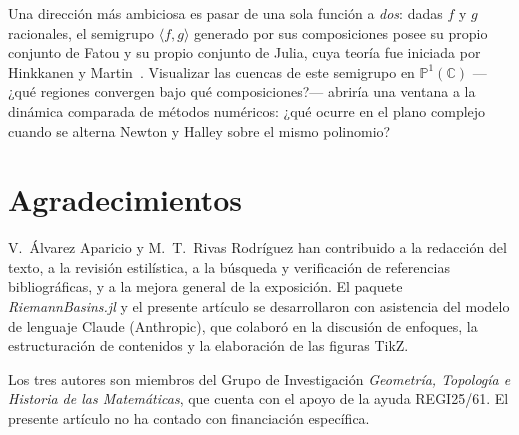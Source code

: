 \documentclass[11pt,a4paper]{article}
\theoremstyle{plain}
\theoremstyle{definition}
\theoremstyle{remark}
\newcommand{\Puno}{\mathbb{P}^1(\mathbb{C})}
\newcommand{\pkg}[1]{\textsl{#1}}
\begin{document}
Una dirección más ambiciosa es pasar de una sola función a
\emph{dos}: dadas $f$ y $g$ racionales, el semigrupo
$\langle f,g\rangle$ generado por sus composiciones posee su propio
conjunto de Fatou y su propio conjunto de Julia, cuya teoría fue
iniciada por Hinkkanen y Martin~\cite{HinkkanenMartin1996}.
Visualizar las cuencas de este semigrupo en $\Puno$ —¿qué regiones
convergen bajo qué composiciones?— abriría una ventana a la dinámica
comparada de métodos numéricos: ¿qué ocurre en el plano complejo
cuando se alterna Newton y Halley sobre el mismo polinomio?

\section*{Agradecimientos}

V.~Álvarez Aparicio y M.~T.~Rivas Rodríguez han contribuido a la
redacción del texto, a la revisión estilística, a la búsqueda y
verificación de referencias bibliográficas, y a la mejora general
de la exposición.
El paquete \pkg{RiemannBasins.jl} y el presente artículo se
desarrollaron con asistencia del modelo de lenguaje Claude
(Anthropic), que colaboró en la discusión de enfoques,
la estructuración de contenidos y la elaboración de las figuras
TikZ.

Los tres autores son miembros del Grupo de Investigación
\emph{Geometría, Topología e Historia de las Matemáticas},
que cuenta con el apoyo de la ayuda REGI25/61.
El presente artículo no ha contado con financiación específica.
\end{document}
